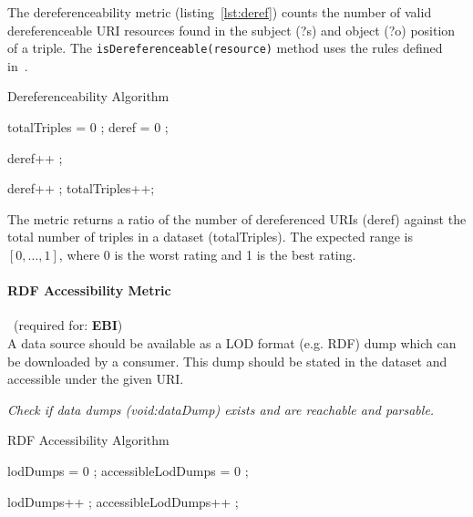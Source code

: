 The dereferenceability metric (listing~\ref{lst:deref}) counts the number of valid dereferenceable URI resources found in the subject (?s) and object (?o) position of a triple. The \texttt{isDereferenceable(resource)} method uses the rules defined in~\cite{Yang2011}.
\begin{algorithm}
\caption{Dereferenceability Algorithm}\label{lst:deref}
\begin{algorithmic}[1]
\State totalTriples = 0 ;
\State deref = 0 ;
\EndProcedure

 deref++ ; \EndIf

 deref++ ; \EndIf
\State totalTriples++;
\EndProcedure
\end{algorithmic}
\end{algorithm}
The metric returns a ratio of the number of dereferenced URIs (deref) against the total number of triples in a dataset (totalTriples). The expected range is $[0,\ldots,1]$, where 0 is the worst rating and 1 is the best rating.

\paragraph{RDF Accessibility Metric}~(required for: \textbf{EBI})~\\
A data source should be available as a LOD format (e.g. RDF) dump which can be downloaded by a consumer.
This dump should be stated in the dataset and accessible under the given URI.

\begin{mdframed}[style=metricdefinition]
\emph{Check if data dumps (void:dataDump) exists and are reachable and parsable.}
\end{mdframed}

\begin{algorithm}
\caption{RDF Accessibility Algorithm}\label{lst:deref}
\begin{algorithmic}[1]
\State lodDumps = 0 ;
\State accessibleLodDumps = 0 ;
\EndProcedure

 lodDumps++ ; \EndIf
{} accessibleLodDumps++ ; \EndIf
\EndProcedure
\end{algorithmic}
\end{algorithm}

